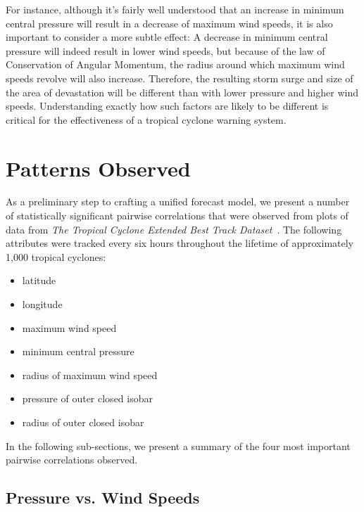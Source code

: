 \documentclass[letterpaper,twocolumn,10pt]{article}
\begin{document}
For instance, although it's fairly well understood that an increase in minimum
central pressure will result in a decrease of maximum wind speeds, it is also
important to consider a more subtle effect: A decrease in minimum central
pressure will indeed result in lower wind speeds, but because of the law of
Conservation of Angular Momentum, the radius around which maximum wind speeds
revolve will also increase. Therefore, the resulting storm surge and size of the
area of devastation will be different than with lower pressure and higher wind
speeds. Understanding exactly how such factors are likely to be different is
critical for the effectiveness of a tropical cyclone warning system.


\section{Patterns Observed}

As a preliminary step to crafting a unified forecast model, we present a number
of statistically significant pairwise correlations that were observed from
plots of data from \emph{The Tropical Cyclone Extended Best Track
Dataset}~\cite{BestTrackDataset}. The following attributes were tracked every
six hours throughout the lifetime of approximately 1,000 tropical cyclones:
\begin{itemize}
  \item latitude
  \item longitude
  \item maximum wind speed
  \item minimum central pressure
  \item radius of maximum wind speed
  \item pressure of outer closed isobar
  \item radius of outer closed isobar
\end{itemize}
In the following sub-sections, we present a summary of the four most important
pairwise correlations observed.


\subsection{Pressure vs. Wind Speeds}
\end{document}
